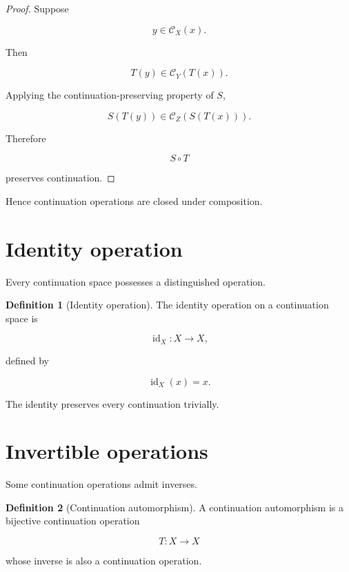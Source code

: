 \documentclass[13pt,openany]{book}
\theoremstyle{plain}
\theoremstyle{definition}
\newtheorem{definition}{Definition}[chapter]
\begin{document}
\begin{proof}

Suppose

\[
y\in\mathcal C_X(x).
\]

Then

\[
T(y)\in\mathcal C_Y(T(x)).
\]

Applying the continuation-preserving property of \(S\),

\[
S(T(y))
\in
\mathcal C_Z(S(T(x))).
\]

Therefore

\[
S\circ T
\]

preserves continuation.

\end{proof}

Hence continuation operations are closed under composition.

\section{Identity operation}

Every continuation space possesses a distinguished operation.

\begin{definition}[Identity operation]

The identity operation on a continuation space is

\[
\operatorname{id}_X:X\longrightarrow X,
\]

defined by

\[
\operatorname{id}_X(x)=x.
\]

\end{definition}

The identity preserves every continuation trivially.

\section{Invertible operations}

Some continuation operations admit inverses.

\begin{definition}[Continuation automorphism]

A continuation automorphism is a bijective continuation operation

\[
T:X\longrightarrow X
\]

whose inverse is also a continuation operation.

\end{definition}
\end{document}
